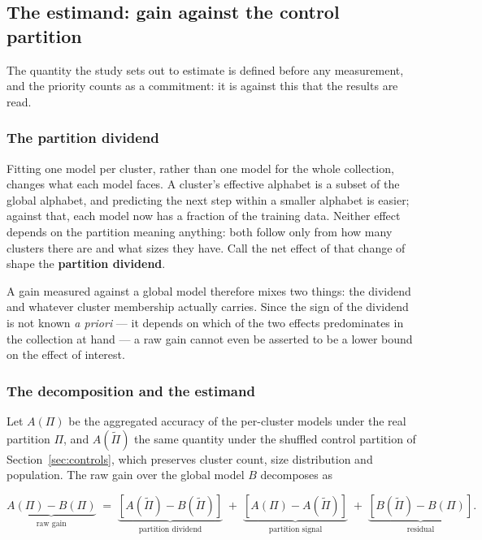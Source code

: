 \subsection{The estimand: gain against the control partition}\label{sec:estimand}

The quantity the study sets out to estimate is defined before any measurement, and the priority
counts as a commitment: it is against this that the results are read.

\subsubsection*{The partition dividend}

Fitting one model per cluster, rather than one model for the whole collection, changes what each
model faces. A cluster's effective alphabet is a subset of the global alphabet, and predicting the
next step within a smaller alphabet is easier; against that, each model now has a fraction of the
training data. Neither effect depends on the partition meaning anything: both follow only from how
many clusters there are and what sizes they have. Call the net effect of that change of shape the
\textbf{partition dividend}.

A gain measured against a global model therefore mixes two things: the dividend and whatever
cluster membership actually carries. Since the sign of the dividend is not known \emph{a priori}
--- it depends on which of the two effects predominates in the collection at hand --- a raw gain
cannot even be asserted to be a lower bound on the effect of interest.

\subsubsection*{The decomposition and the estimand}

Let $A(\Pi)$ be the aggregated accuracy of the per-cluster models under the real partition $\Pi$,
and $A(\tilde{\Pi})$ the same quantity under the shuffled control partition of
Section~\ref{sec:controls}, which preserves cluster count, size distribution and population. The
raw gain over the global model $B$ decomposes as

\[
\underbrace{A(\Pi) - B(\Pi)}_{\text{raw gain}} \;=\;
\underbrace{\left[A(\tilde{\Pi}) - B(\tilde{\Pi})\right]}_{\text{partition dividend}} \;+\;
\underbrace{\left[A(\Pi) - A(\tilde{\Pi})\right]}_{\text{partition signal}} \;+\;
\underbrace{\left[B(\tilde{\Pi}) - B(\Pi)\right]}_{\text{residual}} .
\]

